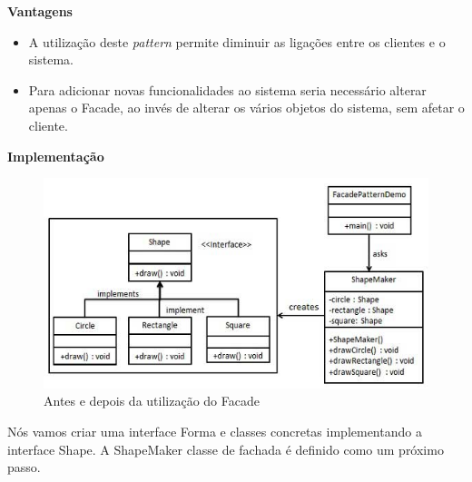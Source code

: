 \textbf{Vantagens}

\begin{itemize}
\item A utilização deste \textit{pattern} permite diminuir as ligações entre os clientes e o sistema.
\item Para adicionar novas funcionalidades ao sistema seria necessário alterar apenas o Facade, ao invés de alterar os vários objetos do sistema, sem afetar o cliente.\\
\end{itemize}


\textbf{Implementação}

\begin{figure}[!h]
\centering
\includegraphics[scale=0.5]{img/facade_diagrama}
\caption{Antes e depois da utilização do Facade}
\end{figure}

 Nós vamos criar uma interface Forma e classes concretas implementando a interface Shape. A ShapeMaker classe de fachada é definido como um próximo passo.


